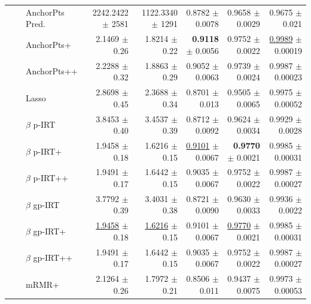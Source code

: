 \begin{longtable}{llp{}rrrrr}
 &  & AnchorPts Pred. & 2242.2422 {\scriptsize $\pm$ 2581} & 1122.3340 {\scriptsize $\pm$ 1291} & 0.8782 {\scriptsize $\pm$ 0.0078} & 0.9658 {\scriptsize $\pm$ 0.0029} & 0.9675 {\scriptsize $\pm$ 0.021} \\
 &  & AnchorPts+ & 2.1469 {\scriptsize $\pm$ 0.26} & 1.8214 {\scriptsize $\pm$ 0.22} & \textbf{0.9118} {\scriptsize $\pm$ 0.0056} & 0.9752 {\scriptsize $\pm$ 0.0022} & \underline{0.9989} {\scriptsize $\pm$ 0.00019} \\
 &  & AnchorPts++ & 2.2288 {\scriptsize $\pm$ 0.32} & 1.8863 {\scriptsize $\pm$ 0.29} & 0.9052 {\scriptsize $\pm$ 0.0063} & 0.9739 {\scriptsize $\pm$ 0.0024} & 0.9987 {\scriptsize $\pm$ 0.00023} \\
 &  & Lasso & 2.8698 {\scriptsize $\pm$ 0.45} & 2.3688 {\scriptsize $\pm$ 0.34} & 0.8701 {\scriptsize $\pm$ 0.013} & 0.9505 {\scriptsize $\pm$ 0.0065} & 0.9975 {\scriptsize $\pm$ 0.00052} \\
 &  & $\beta$ p-IRT & 3.8453 {\scriptsize $\pm$ 0.40} & 3.4537 {\scriptsize $\pm$ 0.39} & 0.8712 {\scriptsize $\pm$ 0.0092} & 0.9624 {\scriptsize $\pm$ 0.0034} & 0.9929 {\scriptsize $\pm$ 0.0028} \\
 &  & $\beta$ p-IRT+ & 1.9458 {\scriptsize $\pm$ 0.18} & 1.6216 {\scriptsize $\pm$ 0.15} & \underline{0.9101} {\scriptsize $\pm$ 0.0067} & \textbf{0.9770} {\scriptsize $\pm$ 0.0021} & 0.9985 {\scriptsize $\pm$ 0.00031} \\
 &  & $\beta$ p-IRT++ & 1.9491 {\scriptsize $\pm$ 0.17} & 1.6442 {\scriptsize $\pm$ 0.15} & 0.9035 {\scriptsize $\pm$ 0.0067} & 0.9752 {\scriptsize $\pm$ 0.0022} & 0.9987 {\scriptsize $\pm$ 0.00027} \\
 &  & $\beta$ gp-IRT & 3.7792 {\scriptsize $\pm$ 0.39} & 3.4031 {\scriptsize $\pm$ 0.38} & 0.8721 {\scriptsize $\pm$ 0.0090} & 0.9630 {\scriptsize $\pm$ 0.0033} & 0.9936 {\scriptsize $\pm$ 0.0022} \\
 &  & $\beta$ gp-IRT+ & \underline{1.9458} {\scriptsize $\pm$ 0.18} & \underline{1.6216} {\scriptsize $\pm$ 0.15} & 0.9101 {\scriptsize $\pm$ 0.0067} & \underline{0.9770} {\scriptsize $\pm$ 0.0021} & 0.9985 {\scriptsize $\pm$ 0.00031} \\
 &  & $\beta$ gp-IRT++ & 1.9491 {\scriptsize $\pm$ 0.17} & 1.6442 {\scriptsize $\pm$ 0.15} & 0.9035 {\scriptsize $\pm$ 0.0067} & 0.9752 {\scriptsize $\pm$ 0.0022} & 0.9987 {\scriptsize $\pm$ 0.00027} \\
 &  & mRMR+ & 2.1264 {\scriptsize $\pm$ 0.26} & 1.7972 {\scriptsize $\pm$ 0.21} & 0.8506 {\scriptsize $\pm$ 0.011} & 0.9437 {\scriptsize $\pm$ 0.0075} & 0.9973 {\scriptsize $\pm$ 0.00053} \\

\end{longtable}
